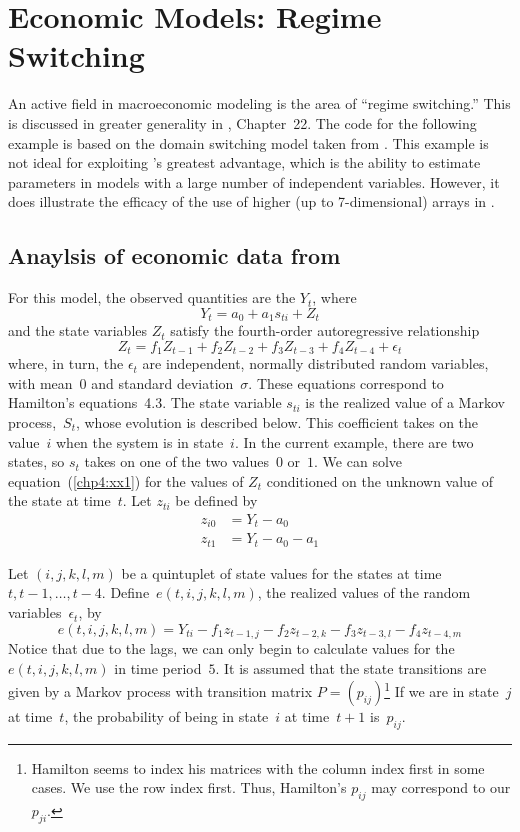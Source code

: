 \documentclass{admbmanual}
\begin{document}


\chapter{Economic Models: Regime Switching}\label{ch:regime-switching}

An active field in macroeconomic modeling is the area of ``regime switching.''
This is discussed in greater generality in \cite{hamilton1994}, Chapter~22.
The code for the following example
is based on the
domain switching model taken from \cite{hamilton1989}.
This example is not ideal for exploiting \ADM's greatest advantage, which is
the ability to estimate parameters in models with a large number of
independent variables. However, it does illustrate the efficacy of the use 
of higher (up to 7-dimensional) arrays in \ADM.


\section{Anaylsis of economic data from \cite{hamilton1989}} 

For this model,
the observed quantities are the $Y_t$, where
\begin{equation}
 {
Y_t=a_0+a_1s_{ti}+Z_t}
\label{chp4:xx1}
\end{equation} 
and the state variables $Z_t$ satisfy the fourth-order 
autoregressive relationship
\begin{equation}
  {
Z_t=f_1Z_{t-1}+f_2Z_{t-2}+f_3Z_{t-3}+f_4Z_{t-4}+
  \epsilon_t }
\label{chp4:xx2}
\end{equation} 
where, in turn, the $\epsilon_t$ are independent, normally distributed random variables,
with mean~$0$  and standard deviation~$\sigma$.
These equations correspond to Hamilton's \cite{hamilton1989} equations~4.3.
The state variable $s_{ti}$ is the realized value of a Markov process,~$S_t$,
whose evolution is described below. This coefficient 
takes on the value~$i$
when the system is in state~$i$. In the current example,
there are two states, so $s_t$ takes on one of the two values~$0$ or~$1$. 
We can solve equation~(\ref{chp4:xx1}) %
 for the values of $Z_t$ conditioned on the
unknown value of the state at time~$t$.
Let $z_{ti}$ be defined by
\begin{align*}
  z_{i0}&=Y_t-a_0\\
  z_{t1}&=Y_t-a_0-a_1
\end{align*}

Let $(i,j,k,l,m)$ be a quintuplet of state values
for the states at time $t,t-1,\ldots,t-4$.
Define~$e(t,i,j,k,l,m)$, the realized values of the
random variables~$\epsilon_t$, by  
$$e(t,i,j,k,l,m)=
  Y_{ti}-f_1z_{t-1,j}-f_2z_{t-2,k}
   -f_3z_{t-3,l}-f_4z_{t-4,m}$$
Notice that due to the lags, we can only begin to calculate values for
the $e(t,i,j,k,l,m)$ in time period~$5$.
It is assumed that the state transitions are given by a Markov process
with transition matrix 
$P=(p_{ij})$\footnote{{%
Hamilton seems to  index his matrices with
the column index first in some cases. 
We use the row index first. Thus, Hamilton's
$p_{ij}$ may correspond to our $p_{ji}$.}}
If we are in state~$j$ at time~$t$, the probability of being in state~$i$ at time~$t+1$ is~$p_{ij}$.
\end{document}
